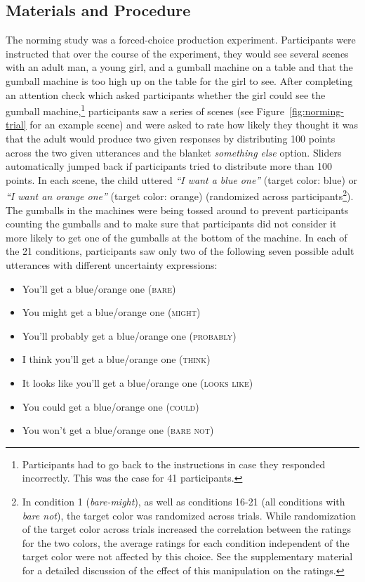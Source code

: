 \documentclass[lucida,biblatex]{sp} %
\begin{document}
\subsection{Materials and Procedure}
The norming study was a forced-choice production experiment. Participants were instructed 
that over the course of the experiment, they would see several scenes with an adult man, 
a young girl, and a gumball machine on a table and 
that the gumball machine is too high up on the table for the girl to see. 
After completing an attention check which asked participants whether 
the girl could see the gumball machine,\footnote{Participants had to go back to the instructions in case they responded incorrectly. This was the case for 41 participants.} 
participants saw a series of scenes (see Figure~\ref{fig:norming-trial} for an example scene) and were asked to rate how likely they thought it was that the 
adult would produce two given responses by distributing 100 points across the two given utterances and the 
blanket \textit{something else} option. Sliders automatically jumped back if participants tried to distribute more than 100 points. 
In each scene, the child uttered \textit{``I want a blue one''} (target color: blue) or  \textit{``I want an orange one''} (target color: orange)
(randomized across participants\footnote{In condition 1 (\textit{bare-might}), as well as conditions 16-21 (all conditions with \textit{bare not}), the target color was randomized across trials. While randomization of the target color across trials increased the correlation between the ratings for the two colors,  the average ratings for each condition independent of the target color were not affected by this choice. See the supplementary material for a detailed discussion of the effect of this manipulation on the ratings.}). The gumballs in the machines were being tossed around to prevent participants counting the gumballs
and to make sure that participants did not consider it more likely to get one of the gumballs at the bottom of the machine.
 In each of the 21 conditions, participants saw only  two of the following seven possible adult utterances with different uncertainty expressions:

 \begin{itemize}
\item You'll get a blue/orange one (\textsc{bare})
\item You might get a blue/orange one (\textsc{might})
\item You'll probably get a blue/orange one (\textsc{probably})
\item I think you'll get a blue/orange one (\textsc{think})
\item It looks like you'll get a blue/orange one (\textsc{looks like})
\item You could get a blue/orange one (\textsc{could})
\item You won't get a blue/orange one (\textsc{bare not})
\end{itemize}
\end{document}
